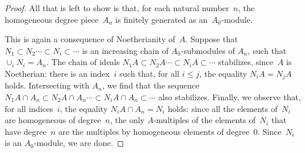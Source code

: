 \documentclass[english]{amsart}
\begin{document}
\begin{proof}
All that is left to show is that, for each natural number~$n$, the homogeneous degree piece~$A_n$ is finitely generated as an~$A_0$-module.

This is again a consequence of Noetherianity of~$A$.  Suppose that $N_1 \subset N_2 \cdots \subset N_i \subset \cdots$ is an increasing chain of $A_0$-submodules of $A_n$, such that $\cup_i N_i = A_n$.  The chain of ideals $N_1 A \subset N_2 A \cdots \subset N_i A \subset \cdots$ stabilizes, since~$A$ is Noetherian: there is an index~$i$ such that, for all $i \le j$, the equality $N_i A = N_j A$ holds.  Intersecting with $A_n$, we find that the sequence $N_1 A \cap A_n \subset N_2 A \cap A_n \cdots \subset N_i A \cap A_n \subset \cdots$ also stabilizes.  Finally, we observe that, for all indices~$i$, the equality $N_i A \cap A_n = N_i$ holds: since all the elements of~$N_i$ are homogeneous of degree~$n$, the only $A$-multiples of the elements of~$N_i$ that have degree~$n$ are the multiples by homogeneous elements of degree~$0$.  Since~$N_i$ is an $A_0$-module, we are done.
\end{proof}
\end{document}

